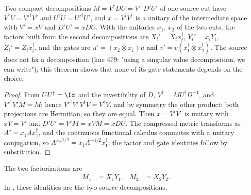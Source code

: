 \begin{lemma}
    \label{thm:mpu_source_factors_change_of_svd}
    \leanok
    Two compact decompositions $M=V^\dagger DU=V'^\dagger D'U'$ of one source cut
    have $V^\dagger V=V'^\dagger V'$ and $U^\dagger U=U'^\dagger U'$, and $x=V'V^\dagger$ is a
    unitary of the intermediate space with $V'=xV$ and $D'U'=xDU$. With the
    unitaries $x_1$, $x_2$ of the two cuts, the factors built from the second
    decompositions are $X_i'=X_ix_i^\dagger$, $Y_i'=x_iY_i$, $Z_i'=Z_ix_i^\dagger$, and
    the gates are $u'=(x_2\otimes x_1)u$ and $v'=v(x_1^\dagger\otimes x_2^\dagger)$. The
    source does not fix a decomposition (line 479: "using a singular value
    decomposition, we can write"); this theorem shows that none of its gate
    statements depends on the choice.
\end{lemma}

\begin{proof}
    \leanok
    From $UU^\dagger=\Id$ and the invertibility of $D$, $V^\dagger=MU^\dagger D^{-1}$,
    and $V'^\dagger V'M=M$; hence $V'^\dagger V'\,V^\dagger V=V^\dagger V$, and by symmetry
    the other product; both projections are Hermitian, so they are equal. Then
    $x=V'V^\dagger$ is unitary with $xV=V'$ and $D'U'=V'M=xVM=xDU$. The compressed
    metric transforms as $A'=x_1Ax_1^\dagger$, and the continuous functional
    calculus commutes with a unitary conjugation, so $A'^{\pm1/2}=x_1A^{\pm1/2}x_1^\dagger$;
    the factor and gate identities follow by substitution.
\end{proof}

\begin{lemma}
    \label{thm:mpu_source_factorizations}
    \leanok
    The two factorizations are
    \begin{align}
        M_1 & =X_1Y_1, & M_2 & =X_2Y_2.
    \end{align}
    In \cite[Section~III]{Cirac2017MPU}, these identities are the two source
    decompositions.
\end{lemma}

